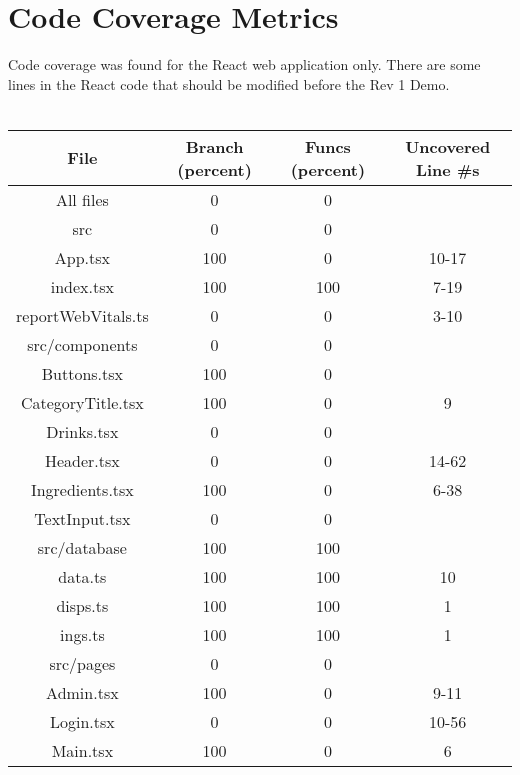\documentclass[12pt, titlepage]{article}
\begin{document}
\section{Code Coverage Metrics}
Code coverage was found for the React web application only. There are some lines in the React code that should be modified before the Rev 1 Demo.\\\\

\begin{center}
\begin{tabular}{||c | c | c | c|} 
 \hline
File                 &  Branch (percent) &  Funcs (percent) & Uncovered Line #s \\
\hline
All files            &       0 &       0 &   \\
 src                 &        0 &      0 &    \\
  App.tsx            &      100 &       0 &   10-17 \\
  index.tsx          &     100 &   100 &     7-19 \\
  reportWebVitals.ts &        0 &        0 & 3-10 \\
 src/components      &        0 &        0 & \\
  Buttons.tsx        &     100 &            0 &  \\
  CategoryTitle.tsx  &     100 &            0 & 9 \\ 
  Drinks.tsx         &      0 &       0 &      \\
  Header.tsx         &        0 &       0 &       14-62 \\
  Ingredients.tsx    &      100 &       0 &     6-38 \\
  TextInput.tsx      &        0&       0 &     \\
 src/database        &     100&   100&       \\
  data.ts            &    100 &   100&      10 \\
  disps.ts           &       100&     100 &     1 \\
  ings.ts            &      100 &     100 &       1 \\
 src/pages           &        0 &       0&       \\
  Admin.tsx          &       100&       0 & 9-11 \\
  Login.tsx          &         0 &      0&10-56 \\
  Main.tsx           &       100 &       0 &6 \\
 \hline
\end{tabular}
\end{center}
\end{document}
